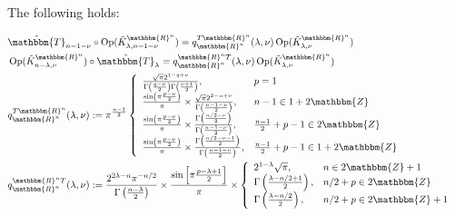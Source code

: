 \documentclass[12pt]{msjproc} %
\newcommand{\assign}{:=}
\newcommand{\tmop}[1]{\ensuremath{\operatorname{#1}}}
\begin{document}
\begin{versiona}
	
The following holds:

\begin{eqnarray}
  & \tilde{\mathbbm{T}}_{n - 1 - \nu} \circ \tmop{Op} (\tilde{K}_{\lambda, n
  - 1 - \nu}^{\mathbbm{R}^n}) = q^{T\mathbbm{R}^n}_{\mathbbm{R}^n} (\lambda,
  \nu) \tmop{Op} (\tilde{K}_{\lambda, \nu}^{\mathbbm{R}^n}) &  \nonumber\\
  & \tmop{Op} (\tilde{K}_{n - \lambda, \nu}^{\mathbbm{R}^n}) \circ
  \tilde{\mathbbm{T}}_{\lambda} = q^{\mathbbm{R}^n T}_{\mathbbm{R}^n}
  (\lambda, \nu) \tmop{Op} (\tilde{K}_{\lambda, \nu}^{\mathbbm{R}^n}) & 
  \nonumber\\
  & q^{T\mathbbm{R}^n}_{\mathbbm{R}^n} (\lambda, \nu) \assign \pi^{\frac{n -
  1}{2}} \left\{ \begin{array}{ll}
    \frac{\sqrt{\pi} 2^{1 - q + \nu}}{\Gamma \left( \frac{q - \nu}{2} \right)
    \Gamma \left( \frac{\nu + 1}{2} \right)}, & p = 1\\
    \frac{\sin \left( \pi \frac{p - \nu}{2} \right)}{\pi} \times
    \frac{\sqrt{\pi} 2^{2 - n + \nu}}{\Gamma \left( \frac{n - 1 - \nu}{2}
    \right)}, & n - 1 \in 1 + 2\mathbbm{Z}\\
    \frac{\sin \left( \pi \frac{p - \nu}{2} \right)}{\pi} \times \frac{\Gamma
    \left( \frac{n / 2 - \nu}{2} \right)}{\Gamma \left( \frac{n - 1 - \nu}{2}
    \right)}, & \frac{n - 1}{2} + p - 1 \in 2\mathbbm{Z}\\
    \frac{\sin \left( \pi \frac{p - \nu}{2} \right)}{\pi} \times \frac{\Gamma
    \left( \frac{n / 2 - \nu - 1}{2} \right)}{\Gamma \left( \frac{n - 1 -
    \nu}{2} \right)}, & \frac{n - 1}{2} + p - 1 \in 1 + 2\mathbbm{Z}
  \end{array} \right. &  \nonumber\\
  & q^{\mathbbm{R}^n T}_{\mathbbm{R}^n} (\lambda, \nu) \assign \frac{2^{2
  \lambda - n} \pi^{- n / 2}}{\Gamma \left( \frac{n - \lambda}{2} \right)}
  \times \frac{\sin \left[ \pi \frac{p - \lambda + 1}{2} \right]}{\pi} \times
  \left\{ \begin{array}{ll}
    2^{1 - \lambda} \sqrt{\pi}, & n \in 2\mathbbm{Z}+ 1\\
    \Gamma \left( \frac{\lambda - n / 2 + 1}{2} \right), & n / 2 + p \in
    2\mathbbm{Z}\\
    \Gamma \left( \frac{\lambda - n / 2}{2} \right), & n / 2 + p \in
    2\mathbbm{Z}+ 1
  \end{array} \right. &  \nonumber
\end{eqnarray}
\end{versiona}
\end{document}
